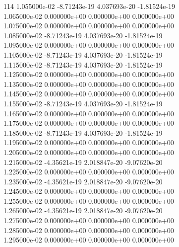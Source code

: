 114	1.055000e-02	-8.71243e-19	4.037693e-20	-1.81524e-19	\\ 	1.065000e-02	0.000000e+00	0.000000e+00	0.000000e+00	\\ 	1.075000e-02	0.000000e+00	0.000000e+00	0.000000e+00	\\ 	1.085000e-02	-8.71243e-19	4.037693e-20	-1.81524e-19	\\ 	1.095000e-02	0.000000e+00	0.000000e+00	0.000000e+00	\\ 	1.105000e-02	-8.71243e-19	4.037693e-20	-1.81524e-19	\\ 	1.115000e-02	-8.71243e-19	4.037693e-20	-1.81524e-19	\\ 	1.125000e-02	0.000000e+00	0.000000e+00	0.000000e+00	\\ 	1.135000e-02	0.000000e+00	0.000000e+00	0.000000e+00	\\ 	1.145000e-02	0.000000e+00	0.000000e+00	0.000000e+00	\\ 	1.155000e-02	-8.71243e-19	4.037693e-20	-1.81524e-19	\\ 	1.165000e-02	0.000000e+00	0.000000e+00	0.000000e+00	\\ 	1.175000e-02	0.000000e+00	0.000000e+00	0.000000e+00	\\ 	1.185000e-02	-8.71243e-19	4.037693e-20	-1.81524e-19	\\ 	1.195000e-02	0.000000e+00	0.000000e+00	0.000000e+00	\\ 	1.205000e-02	0.000000e+00	0.000000e+00	0.000000e+00	\\ 	1.215000e-02	-4.35621e-19	2.018847e-20	-9.07620e-20	\\ 	1.225000e-02	0.000000e+00	0.000000e+00	0.000000e+00	\\ 	1.235000e-02	-4.35621e-19	2.018847e-20	-9.07620e-20	\\ 	1.245000e-02	0.000000e+00	0.000000e+00	0.000000e+00	\\ 	1.255000e-02	0.000000e+00	0.000000e+00	0.000000e+00	\\ 	1.265000e-02	-4.35621e-19	2.018847e-20	-9.07620e-20	\\ 	1.275000e-02	0.000000e+00	0.000000e+00	0.000000e+00	\\ 	1.285000e-02	0.000000e+00	0.000000e+00	0.000000e+00	\\ 	1.295000e-02	0.000000e+00	0.000000e+00	0.000000e+00	\\ \hline
